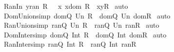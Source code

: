 \begin{isabellebody}
\ Ran{\isacharunderscore}In{\isacharcolon}\ {\isachardoublequoteopen}y{\isacharcolon}ran\ R\ {\isacharequal}\ {\isacharparenleft}{\isacharquery}\ x{\isachardot}\ x{\isacharcolon}dom\ R\ {\isacharampersand}\ {\isacharparenleft}x{\isacharcomma}y{\isacharparenright}{\isacharcolon}R{\isacharparenright}{\isachardoublequoteclose}\isanewline
%
\isadelimproof
%
\endisadelimproof
%
\isatagproof
{}\isamarkupfalse%
\ auto\isanewline
{}\isamarkupfalse%
%
\endisatagproof
{\isafoldproof}%
%
\isadelimproof
\isanewline
%
\endisadelimproof
\isanewline
{}\isamarkupfalse%
\ Dom{\isacharunderscore}Union{\isacharbrackleft}simp{\isacharbrackright}{\isacharcolon}\ {\isachardoublequoteopen}dom{\isacharparenleft}Q\ Un\ R{\isacharparenright}\ {\isacharequal}\ dom{\isacharparenleft}Q{\isacharparenright}\ Un\ dom{\isacharparenleft}R{\isacharparenright}{\isachardoublequoteclose}\isanewline
%
\isadelimproof
%
\endisadelimproof
%
\isatagproof
{}\isamarkupfalse%
\ auto\isanewline
{}\isamarkupfalse%
%
\endisatagproof
{\isafoldproof}%
%
\isadelimproof
\isanewline
%
\endisadelimproof
\isanewline
{}\isamarkupfalse%
\ Ran{\isacharunderscore}Union{\isacharbrackleft}simp{\isacharbrackright}{\isacharcolon}\ {\isachardoublequoteopen}ran{\isacharparenleft}Q\ Un\ R{\isacharparenright}\ {\isacharequal}\ ran{\isacharparenleft}Q{\isacharparenright}\ Un\ ran{\isacharparenleft}R{\isacharparenright}{\isachardoublequoteclose}\isanewline
%
\isadelimproof
%
\endisadelimproof
%
\isatagproof
{}\isamarkupfalse%
\ auto\isanewline
{}\isamarkupfalse%
%
\endisatagproof
{\isafoldproof}%
%
\isadelimproof
\isanewline
%
\endisadelimproof
\isanewline
{}\isamarkupfalse%
\ Dom{\isacharunderscore}Inter{\isacharbrackleft}simp{\isacharbrackright}{\isacharcolon}\ {\isachardoublequoteopen}dom{\isacharparenleft}Q\ Int\ R{\isacharparenright}\ {\isacharless}{\isacharequal}\ dom{\isacharparenleft}Q{\isacharparenright}\ Int\ dom{\isacharparenleft}R{\isacharparenright}{\isachardoublequoteclose}\isanewline
%
\isadelimproof
%
\endisadelimproof
%
\isatagproof
{}\isamarkupfalse%
\ auto\isanewline
{}\isamarkupfalse%
%
\endisatagproof
{\isafoldproof}%
%
\isadelimproof
\isanewline
%
\endisadelimproof
\isanewline
{}\isamarkupfalse%
\ Ran{\isacharunderscore}Inter{\isacharbrackleft}simp{\isacharbrackright}{\isacharcolon}\ {\isachardoublequoteopen}ran{\isacharparenleft}Q\ Int\ R{\isacharparenright}\ {\isacharless}{\isacharequal}\ ran{\isacharparenleft}Q{\isacharparenright}\ Int\ ran{\isacharparenleft}R{\isacharparenright}{\isachardoublequoteclose}\isanewline

\end{isabellebody}
